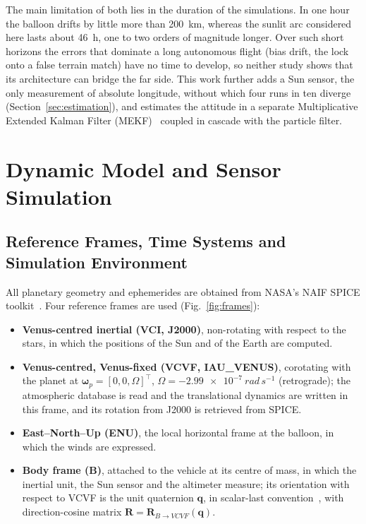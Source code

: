 \documentclass[preprint,12pt,a4paper]{elsarticle}
\begin{document}
The main limitation of both lies in the duration of the simulations.
In one hour the balloon drifts by little more than \SI{200}{km}, whereas the sunlit arc
considered here lasts about \SI{46}{h}, one to two orders of magnitude longer.
Over such short horizons the errors that dominate a long autonomous flight (bias drift, the lock onto a false terrain match)
have no time to develop, so neither study shows that its architecture can bridge the far
side.
This work further adds a Sun sensor, the only measurement of absolute longitude, without
which four runs in ten diverge (Section~\ref{sec:estimation}), and estimates the attitude
in a separate Multiplicative Extended Kalman Filter (MEKF)~\cite{Lefferts1982,Markley2003}
coupled in cascade with the particle filter.

\section{Dynamic Model and Sensor Simulation}\label{sec:model}
\subsection{Reference Frames, Time Systems and Simulation Environment}

All planetary geometry and ephemerides are obtained from NASA's NAIF SPICE
toolkit~\cite{Acton1996}.
Four reference frames are used (Fig.~\ref{fig:frames}):
\begin{itemize}
\item \textbf{Venus-centred inertial (VCI, J2000)}, non-rotating with respect to the stars,
in which the positions of the Sun and of the Earth are computed.
\item \textbf{Venus-centred, Venus-fixed (VCVF, IAU\_VENUS)}, corotating with the planet at
$\boldsymbol{\omega}_p=[0,0,\Omega]^\top$, $\Omega=\SI{-2.99e-7}{rad\,s^{-1}}$
(retrograde); the atmospheric database is read and the translational dynamics are written
in this frame, and its rotation from J2000 is retrieved from SPICE.
\item \textbf{East--North--Up (ENU)}, the local horizontal frame at the balloon, in which
the winds are expressed.
\item \textbf{Body frame (B)}, attached to the vehicle at its centre of mass, in which the
inertial unit, the Sun sensor and the altimeter measure; its orientation with respect to
VCVF is the unit quaternion $\mathbf{q}$, in scalar-last convention~\cite{Markley2003}, with
direction-cosine matrix $\mathbf{R}=\mathbf{R}_{B\to VCVF}(\mathbf{q})$.
\end{itemize}
\end{document}

